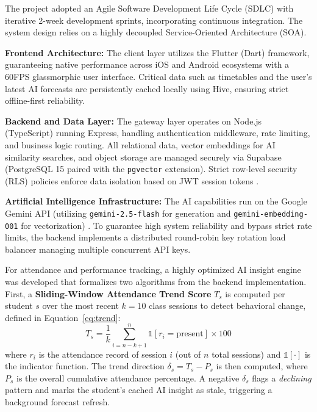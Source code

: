 \documentclass[]{einformatica}
\begin{document}
The project adopted an Agile Software Development Life Cycle (SDLC) with iterative 2-week development sprints, incorporating continuous integration. The system design relies on a highly decoupled Service-Oriented Architecture (SOA). 

\textbf{Frontend Architecture:} The client layer utilizes the Flutter (Dart) framework, guaranteeing native performance across iOS and Android ecosystems with a 60FPS glassmorphic user interface. Critical data such as timetables and the user's latest AI forecasts are persistently cached locally using Hive, ensuring strict offline-first reliability.

\textbf{Backend and Data Layer:} The gateway layer operates on Node.js (TypeScript) running Express, handling authentication middleware, rate limiting, and business logic routing. All relational data, vector embeddings for AI similarity searches, and object storage are managed securely via Supabase (PostgreSQL 15 paired with the \texttt{pgvector} extension). Strict row-level security (RLS) policies enforce data isolation based on JWT session tokens \cite{supabase2024, owasp2023}.

\textbf{Artificial Intelligence Infrastructure:} The AI capabilities run on the Google Gemini API (utilizing \texttt{gemini-2.5-flash} for generation and \texttt{gemini-embedding-001} for vectorization) \cite{gemini2024, openai2024}. To guarantee high system reliability and bypass strict rate limits, the backend implements a distributed round-robin key rotation load balancer managing multiple concurrent API keys.

For attendance and performance tracking, a highly optimized AI insight engine was developed that formalizes two algorithms from the backend implementation. First, a \textbf{Sliding-Window Attendance Trend Score} $T_s$ is computed per student $s$ over the most recent $k=10$ class sessions to detect behavioral change, defined in Equation~\ref{eq:trend}:
\begin{equation} \label{eq:trend}
T_s = \frac{1}{k} \sum_{i=n-k+1}^{n} \mathbb{1}[r_i = \text{present}] \times 100
\end{equation}
where $r_i$ is the attendance record of session $i$ (out of $n$ total sessions) and $\mathbb{1}[\cdot]$ is the indicator function. The trend direction $\delta_s = T_s - P_s$ is then computed, where $P_s$ is the overall cumulative attendance percentage. A negative $\delta_s$ flags a \textit{declining} pattern and marks the student's cached AI insight as stale, triggering a background forecast refresh.
\end{document}
